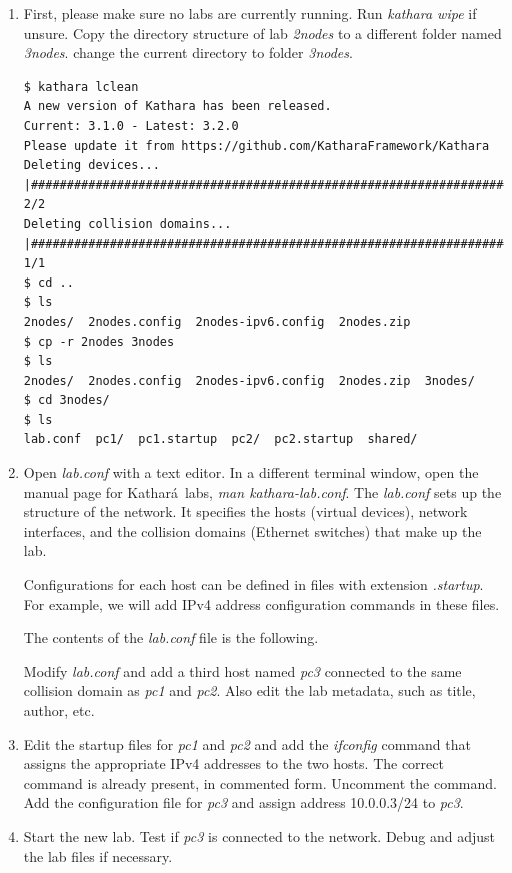 \documentclass[12pt]{book}
\newcommand{\kathara}{Kathar\'a}
\begin{document}
\begin{enumerate}[resume*]
\item First, please make sure no labs are currently running. Run \emph{kathara wipe} if unsure. Copy the directory structure of lab \emph{2nodes} to a different folder named \emph{3nodes}. change the current directory to folder \emph{3nodes}.

  \begin{lstlisting}
$ kathara lclean
A new version of Kathara has been released.
Current: 3.1.0 - Latest: 3.2.0
Please update it from https://github.com/KatharaFramework/Kathara
Deleting devices... |#####################################################################################| 2/2
Deleting collision domains... |###########################################################################| 1/1
$ cd ..
$ ls
2nodes/  2nodes.config  2nodes-ipv6.config  2nodes.zip
$ cp -r 2nodes 3nodes
$ ls
2nodes/  2nodes.config  2nodes-ipv6.config  2nodes.zip  3nodes/
$ cd 3nodes/
$ ls
lab.conf  pc1/  pc1.startup  pc2/  pc2.startup  shared/
  \end{lstlisting}

\item Open \emph{lab.conf} with a text editor. In a different terminal window, open the manual page for \kathara\ labs, \emph{man kathara-lab.conf}. The \emph{lab.conf} sets up the structure of the network. It specifies the hosts (virtual devices), network interfaces, and the collision domains (Ethernet switches) that make up the lab.

  Configurations for each host can be defined in files with extension \emph{.startup}. For example, we will add IPv4 address configuration commands in these files.

  The contents of the \emph{lab.conf} file is the following.

  

  Modify \emph{lab.conf} and add a third host named \emph{pc3} connected to the same collision domain as \emph{pc1} and \emph{pc2}. Also edit the lab metadata, such as title, author, etc.

\item Edit the startup files for \emph{pc1} and \emph{pc2} and add the \emph{ifconfig} command that assigns the appropriate IPv4 addresses to the two hosts. The correct command is already present, in commented form. Uncomment the command. Add the configuration file for \emph{pc3} and assign address 10.0.0.3/24 to \emph{pc3}.

\item Start the new lab. Test if \emph{pc3} is connected to the network. Debug and adjust the lab files if necessary.

\end{enumerate}
\end{document}
